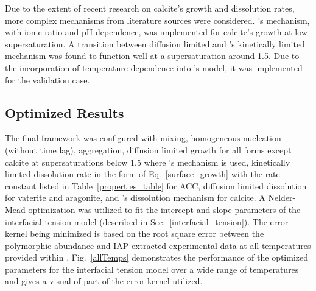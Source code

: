 \documentclass[preprint,3p,a4paper,times,12pt,authoryear]{elsarticle}
\begin{document}
Due to the extent of recent research on calcite's growth and dissolution rates, more complex mechanisms from literature sources were considered.  \cite{Wolthers2012}'s mechanism, with ionic ratio and pH dependence, was implemented for calcite's growth at low supersaturation.  A transition between diffusion limited and \citeauthor{Wolthers2012}'s kinetically limited mechanism was found to function well at a supersaturation around 1.5.  Due to the incorporation of temperature dependence into \cite{Plummer1978}'s model, it was implemented for the validation case.


\subsection{Optimized Results}
\label{Model_Results}

The final framework was configured with mixing, homogeneous nucleation (without time lag), aggregation, diffusion limited growth for all  forms except calcite at supersaturations below 1.5 where \cite{Wolthers2012}'s mechanism is used, kinetically limited dissolution rate in the form of Eq.~\ref{surface_growth} with the rate constant listed in Table~\ref{properties_table} for ACC, diffusion limited dissolution for vaterite and aragonite, and \cite{Plummer1978}'s dissolution mechanism for calcite.  A Nelder-Mead optimization was utilized to fit the intercept and slope parameters of the interfacial tension model (described in Sec.~\ref{interfacial_tension}).  The error kernel being minimized is based on the root square error between the polymorphic abundance and IAP extracted experimental data at all temperatures provided within \citep{Ogino1987}.  
Fig.~\ref{allTemps} demonstrates the performance of the optimized parameters for the interfacial tension model over a wide range of temperatures and gives a visual of part of the error kernel utilized.  
\end{document}
